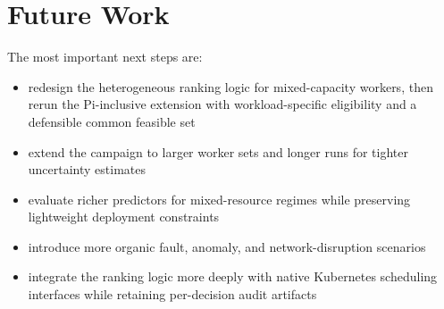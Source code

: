 \section{Future Work}
\label{sec:future-work}

The most important next steps are:

\begin{itemize}
\item redesign the heterogeneous ranking logic for mixed-capacity workers, then rerun the Pi-inclusive extension with workload-specific eligibility and a defensible common feasible set
\item extend the campaign to larger worker sets and longer runs for tighter uncertainty estimates
\item evaluate richer predictors for mixed-resource regimes while preserving lightweight deployment constraints
\item introduce more organic fault, anomaly, and network-disruption scenarios
\item integrate the ranking logic more deeply with native Kubernetes scheduling interfaces while retaining per-decision audit artifacts
\end{itemize}